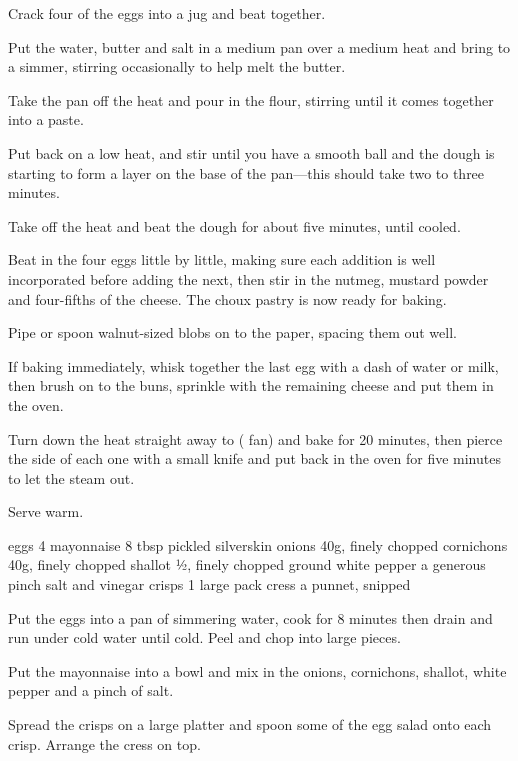 \begin{method}
    Crack four of the eggs into a jug and beat together.

    Put the water, butter and salt in a medium pan over a medium heat and bring to a simmer,
    stirring occasionally to help melt the butter.

    Take the pan off the heat and pour in the flour, stirring until it comes together into a paste. 
    
    Put back on a low heat, and stir until you have a smooth ball and the dough is starting to form 
    a layer on the base of the pan---this should take two to three minutes.

    Take off the heat and beat the dough for about five minutes, until cooled.

    Beat in the four eggs little by little, making sure each addition is well incorporated 
    before adding the next, then stir in the nutmeg, mustard powder and four-fifths of the 
    cheese.  The choux pastry is now ready for baking.

    Pipe or spoon walnut-sized blobs on to the paper, spacing them out well.

    If baking immediately, whisk together the last egg with a dash of water or milk, then brush 
    on to the buns, sprinkle with the remaining cheese and put them in the oven.

    Turn down the heat straight away to  ( fan) and bake for 20 minutes, 
    then pierce the side of each one with a small knife and put back in the oven for five minutes 
    to let the steam out.

    Serve warm.
\end{method}




\begin{ingreds}
    eggs 4
    mayonnaise 8 tbsp
    pickled silverskin onions 40g, finely chopped
    cornichons 40g, finely chopped
    shallot ½, finely chopped
    ground white pepper a generous pinch
    salt and vinegar crisps 1 large pack
    cress a punnet, snipped
\end{ingreds}

\begin{method}
    Put the eggs into a pan of simmering water, cook for 8 minutes then drain and run under 
    cold water until cold. Peel and chop into large pieces.

    Put the mayonnaise into a bowl and mix in the onions, cornichons, shallot, white pepper 
    and a pinch of salt.

    Spread the crisps on a large platter and spoon some of the egg salad onto each crisp. 
    Arrange the cress on top.
\end{method}